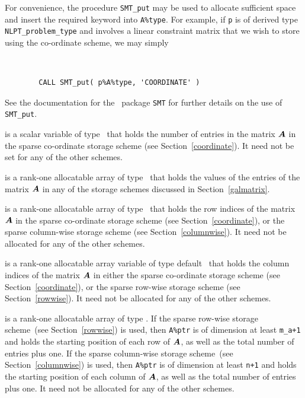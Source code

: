 \documentclass{galahad}
\begin{document}
\begin{description}
\begin{description}
For convenience, the procedure {\tt SMT\_put} 
may be used to allocate sufficient space and insert the required keyword
into {\tt A\%type}.
For example, if {\tt p} is of derived type {\tt NLPT\_problem\_type}
and involves a linear constraint matrix that we wish to store using the co-ordinate scheme,
we may simply
{\tt 
\begin{verbatim}
        CALL SMT_put( p%A%type, 'COORDINATE' )
\end{verbatim}
}
\noindent
See the documentation for the \galahad\ package {\tt SMT} 
for further details on the use of {\tt SMT\_put}.

 is a scalar variable of type \integer\ that holds
the number of entries in the matrix ${\bm{A}}$ in the sparse co-ordinate
storage scheme (see Section~\ref{coordinate}).  It need not be set for
any of the other schemes.

 is a rank-one allocatable array of type \realdp\ that holds
the values of the entries of the matrix ${\bm{A}}$ in any of the 
storage schemes discussed in Section~\ref{galmatrix}.

 is a rank-one allocatable array of type \integer\
that holds the row indices of the matrix ${\bm{A}}$ in the sparse
co-ordinate storage scheme (see Section~\ref{coordinate}), or the
sparse column-wise storage scheme (see Section~\ref{columnwise}).  It
need not be allocated for any of the other schemes.

 is a rank-one allocatable array variable of type default
\integer\ that holds the column indices of the matrix ${\bm{A}}$ in
either the sparse co-ordinate storage scheme (see Section~\ref{coordinate}), or the
sparse row-wise storage scheme (see Section~\ref{rowwise}).  It need
not be allocated for any of the other schemes.

 is a rank-one allocatable array of type \integer.
If the sparse row-wise storage scheme~(see Section~\ref{rowwise}) is used,
then {\tt A\%ptr} is of dimension at least {\tt m\_a+1} and holds the
starting position of each row of ${\bm{A}}$, as well as the total number
of entries plus one.  If the sparse column-wise storage scheme~(see
Section~\ref{columnwise}) is used, then {\tt A\%ptr} is of dimension
at least {\tt n+1} and holds the starting position of each column of ${\bm{A}}$, as well as
the total number of entries plus one.  It need not be allocated for
any of the other schemes.


\end{description}
\end{description}
\end{document}
